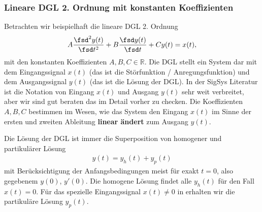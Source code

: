 \subsubsection{Lineare DGL 2. Ordnung mit konstanten Koeffizienten}
Betrachten wir beispielhaft die lineare DGL 2. Ordnung
\begin{align}
\label{eq:A7BEE9E24E_DGL}
A \frac{\fsd^2 y(t)}{\fsd t^2} + B \frac{\fsd y(t)}{\fsd t} + C y(t) = x(t),
\end{align}
mit den konstanten Koeffizienten $A,B,C\in\mathbb{R}$.
%
Die DGL stellt ein System dar mit dem Eingangssignal $x(t)$
(das ist die Störfunktion / Anregungsfunktion) und dem Ausgangssignal
$y(t)$ (das ist die Lösung der DGL).
%
In der SigSys Literatur ist die Notation von Eingang $x(t)$ und Ausgang $y(t)$
sehr weit verbreitet, aber wir sind gut beraten das im Detail vorher zu checken.
%
Die Koeffizienten $A,B,C$ bestimmen im Wesen, wie das System den Eingang $x(t)$
im Sinne der ersten und zweiten Ableitung \textbf{linear ändert} zum Ausgang $y(t)$.

Die Lösung der DGL ist immer die Superposition von homogener und partikulärer
Lösung
%
\begin{align}
y(t) = y_h(t) + y_p(t)
\end{align}
mit Berücksichtigung der Anfangsbedingungen meist für exakt $t=0$, also gegebenem
$y(0)$, $y'(0)$.
%
Die homogene Lösung findet alle $y_h(t)$ für den Fall $x(t)=0$.
%
Für das spezielle Eingangssignal $x(t)\neq 0$ in
 erhalten wir die partikuläre Lösung $y_p(t)$.
%
